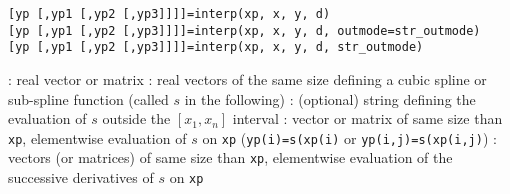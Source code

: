 
\begin{mandesc}
\end{mandesc}

\begin{calling_sequence}
    \begin{verbatim}
[yp [,yp1 [,yp2 [,yp3]]]]=interp(xp, x, y, d)
[yp [,yp1 [,yp2 [,yp3]]]]=interp(xp, x, y, d, outmode=str_outmode)
[yp [,yp1 [,yp2 [,yp3]]]]=interp(xp, x, y, d, str_outmode)
    \end{verbatim}
\end{calling_sequence}

\begin{parameters}
  \begin{varlist}
   : real vector or matrix
   : real vectors of the same size defining a cubic spline or sub-spline function 
                (called $s$ in the following)
   : (optional) string defining the evaluation of $s$ outside the $[x_1,x_n]$ interval
   : vector or matrix of same size than \verb!xp!, elementwise evaluation of $s$
                on \verb!xp! (\verb!yp(i)=s(xp(i)! or \verb!yp(i,j)=s(xp(i,j)!)
   : vectors (or matrices) of same size than \verb!xp!, elementwise evaluation of the 
                successive derivatives of $s$ on \verb!xp!
  \end{varlist}
\end{parameters}


